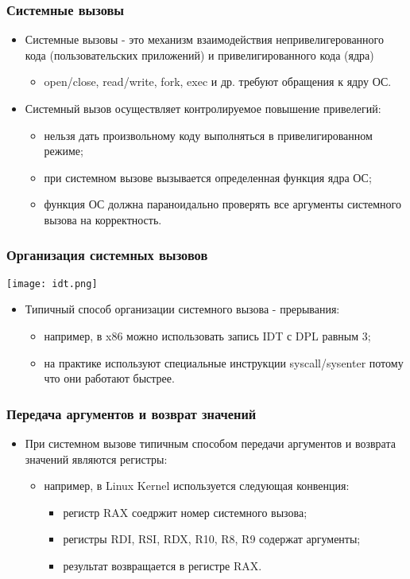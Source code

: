 \begin{frame}
\frametitle{Системные вызовы}
\begin{itemize}
  \item Системные вызовы - это механизм взаимодействия непривелигерованного кода
  (пользовательских приложений) и привелигированного кода (ядра)
  \begin{itemize}
    \item open/close, read/write, fork, exec и др. требуют обращения к ядру ОС.
  \end{itemize}
  \item Системный вызов осуществляет контролируемое повышение привелегий:
  \begin{itemize}
    \item нельзя дать произвольному коду выполняться в привелигированном режиме;
    \item при системном вызове вызывается определенная функция ядра ОС;
    \item функция ОС должна параноидально проверять все аргументы системного
    вызова на корректность.
  \end{itemize}
\end{itemize}
\end{frame}

\begin{frame}
\frametitle{Организация системных вызовов}
\begin{center}
  \texttt{[image: idt.png]}
\end{center}
\begin{itemize}
  \item Типичный способ организации системного вызова - прерывания:
  \begin{itemize}
    \item например, в x86 можно использовать запись IDT с DPL равным 3;
    \item на практике используют специальные инструкции syscall/sysenter потому
    что они работают быстрее.
  \end{itemize}
\end{itemize}
\end{frame}

\begin{frame}
\frametitle{Передача аргументов и возврат значений}
\begin{itemize}
  \item При системном вызове типичным способом передачи аргументов и возврата
  значений являются регистры:
  \begin{itemize}
    \item например, в Linux Kernel используется следующая конвенция:
    \begin{itemize}
      \item регистр RAX соедржит номер системного вызова;
      \item регистры RDI, RSI, RDX, R10, R8, R9 содержат аргументы;
      \item результат возвращается в регистре RAX.
    \end{itemize}
  \end{itemize}
\end{itemize}
\end{frame}

